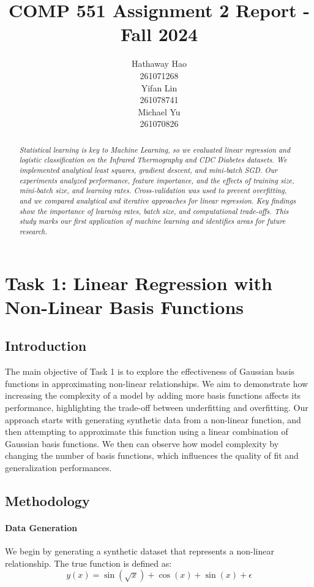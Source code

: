 \documentclass{article}
\title{COMP 551 Assignment 2 Report - Fall 2024}
\author{
 Hathaway Hao \\
  261071268\\
   \And
 Yifan Lin \\
  261078741\\
  \And
 Michael Yu \\
  261070826\\
}
\begin{document}
\maketitle
\begin{abstract}
\textit {Statistical learning is key to Machine Learning, so we evaluated linear regression and logistic classification on the Infrared Thermography and CDC Diabetes datasets. We implemented analytical least squares, gradient descent, and mini-batch SGD. Our experiments analyzed performance, feature importance, and the effects of training size, mini-batch size, and learning rates. Cross-validation was used to prevent overfitting, and we compared analytical and iterative approaches for linear regression. Key findings show the importance of learning rates, batch size, and computational trade-offs. This study marks our first application of machine learning and identifies areas for future research.}

\end{abstract}



\section{Task 1: Linear Regression with Non-Linear Basis Functions}

\subsection{Introduction}
\noindent The main objective of Task 1 is to explore the effectiveness of Gaussian basis functions in approximating non-linear relationships. We aim to demonstrate how increasing the complexity of a model by adding more basis functions affects its performance, highlighting the trade-off between underfitting and overfitting. Our approach starts with generating synthetic data from a non-linear function, and then attempting to approximate this function using a linear combination of Gaussian basis functions. We then can observe how model complexity by changing the number of basis functions, which influences the quality of fit and generalization performances.


\subsection{Methodology}
\paragraph{Data Generation}
We begin by generating a synthetic dataset that represents a non-linear relationship. The true function is defined as:
\[
y(x) = \sin(\sqrt{x}) + \cos(x) + \sin(x) + \epsilon
\]
\end{document}
